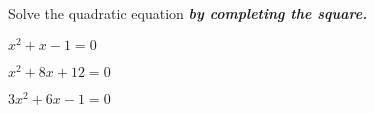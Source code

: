 \vfill
\begin{center} \hfill
\end{center}

\begin{exercise}Solve the quadratic equation \textbf{\em by completing the square.}
	\\
	\begin{enumerate*}[label={(\arabic*)~}]
		\item $x^2+x-1=0$
		\item $x^2+8x+12=0$
		\item $3x^2+6x-1=0$
		\hfill\null
	\end{enumerate*}
\end{exercise}

\vfill
\begin{center} \hfill
\end{center}